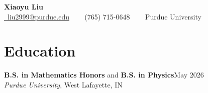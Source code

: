 \documentclass[11pt,letterpaper]{article}
\begin{document}
\begin{center}
    {\LARGE\bfseries Xiaoyu Liu} \\[6pt]  %
    \color{sectionblue}  %
    \href{mailto:liu2999@purdue.edu}{\faEnvelope\ liu2999@purdue.edu} 
    \textcolor{black}{\ \textbullet\ } 
    \faPhone\ (765) 715-0648
    \textcolor{black}{\ \textbullet\ }
    \faUniversity\ Purdue University
\end{center}

\section*{Education}
\noindent
\textbf{B.S. in Mathematics Honors} and \textbf{B.S. in Physics}\hfill May 2026\\
\textit{Purdue University}, West Lafayette, IN \\

\end{document}
